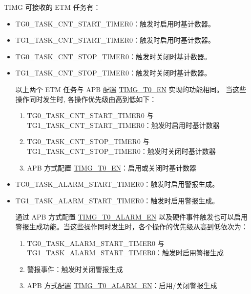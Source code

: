 \documentclass[main\_\_CN.tex]{subfiles}
\begin{document}
TIMG 可接收的 ETM 任务有：

\begin{itemize}
    \item TG0\_TASK\_CNT\_START\_TIMER0：触发时启用时基计数器。
    \item TG1\_TASK\_CNT\_START\_TIMER0：触发时启用时基计数器。
    \item TG0\_TASK\_CNT\_STOP\_TIMER0：触发时关闭时基计数器。
    \item TG1\_TASK\_CNT\_STOP\_TIMER0：触发时关闭时基计数器。

\begin{tiplisting}
以上两个 ETM 任务与 APB 配置 \hyperref[fielddesc:TIMGTXEN]{TIMG\_T0\_EN} 实现的功能相同。 当这些操作同时发生时, 各操作优先级由高到低如下：

\begin{enumerate}
    \item TG0\_TASK\_CNT\_START\_TIMER0 与 TG1\_TASK\_CNT\_START\_TIMER0：触发时启用时基计数器
    \item TG0\_TASK\_CNT\_STOP\_TIMER0 与 TG1\_TASK\_CNT\_STOP\_TIMER0：触发时关闭时基计数器
    \item APB 方式配置 \hyperref[fielddesc:TIMGTXEN]{TIMG\_T0\_EN}：启用或关闭时基计数器
\end{enumerate}
\end{tiplisting}

\item TG0\_TASK\_ALARM\_START\_TIMER0：触发时启用警报生成。
\item TG1\_TASK\_ALARM\_START\_TIMER0：触发时启用警报生成。

\begin{tiplisting}
通过 APB 方式配置 \hyperref[fielddesc:TIMGTXALARMEN]{TIMG\_T0\_ALARM\_EN} 以及硬件事件触发也可以启用警报生成功能。当这些操作同时发生时，各个操作的优先级从高到低依次为：

\begin{enumerate}
    \item TG0\_TASK\_ALARM\_START\_TIMER0 与 TG1\_TASK\_ALARM\_START\_TIMER0：触发时启用警报生成
    \item 警报事件：触发时关闭警报生成
    \item APB 方式配置 \hyperref[fielddesc:TIMGTXALARMEN]{TIMG\_T0\_ALARM\_EN}：启用/关闭警报生成
\end{enumerate}
\end{tiplisting}



\end{itemize}
\end{document}

